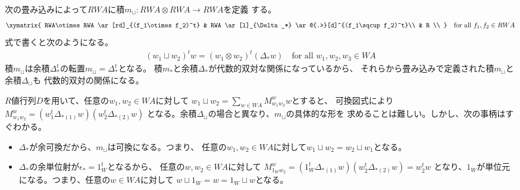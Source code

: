 	次の畳み込みによって$RWA$に積$m_\sqcup:RWA\otimes RWA\to RWA$を定義
	する。
	\begin{equation}\label{eq:シャッフル積の可換図その一}\begin{split} %
		\xymatrix{
			RWA\otimes RWA \ar[rd]_{(f_1\otimes f_2)^t} 
			& RWA \ar[l]_{\Delta_*} \ar@{.>}[d]^{(f_1\sqcup f_2)^t}\\
			& R  \\
		} \quad\text{for all }f_1,f_2\in RWA
	\end{split}\end{equation} %
	式で書くと次のようになる。
	\begin{equation*}\begin{split} %
		(w_1\sqcup w_2)^tw = (w_1\otimes w_2)^t(\Delta_*w)
		\quad\text{for all }w_1,w_2,w_3\in WA
	\end{split}\end{equation*} %
	積$m_\sqcup$は余積$\Delta_*^t$の転置$m_\sqcup=\Delta_*^t$となる。
	積$m_*$と余積$\Delta_*$が代数的双対な関係になっているから、
	それらから畳み込みで定義された積$m_\sqcup$と余積$\Delta_\sqcup$も
	代数的双対の関係になる。

	$R$値行列$D$を用いて、任意の$w_1,w_2\in WA$に対して
	$w_1\sqcup w_2=\sum_{w\in WA}M_{w_1w_2}^ww$とすると、
	可換図式により$M_{w_1w_2}^w=(w_1^t\Delta_{*(1)}w)(w_2^t\Delta_{*(2)}w)$
	となる。余積$\Delta_\sqcup$の場合と異なり、$m_\sqcup$の具体的な形を
	求めることは難しい。しかし、次の事柄はすぐわかる。
	\begin{itemize}\setlength{\itemsep}{-1mm} %
		\item $\Delta_*$が余可換だから、$m_\sqcup$は可換になる。つまり、
		任意の$w_1,w_2\in WA$に対して$w_1\sqcup w_2=w_2\sqcup w_1$となる。
		\item $\Delta_*$の余単位射が$\epsilon_*=1_W^t$となるから、
		任意の$w,w_2\in WA$に対して
		$M_{1_Ww_2}^w=(1_W^t\Delta_{*(1)}w)(w_2^t\Delta_{*(2)}w)=w_2^tw$
		となり、$1_W$が単位元になる。つまり、任意の$w\in WA$に対して
		$w\sqcup 1_W=w=1_W\sqcup w$となる。
	\end{itemize} %


